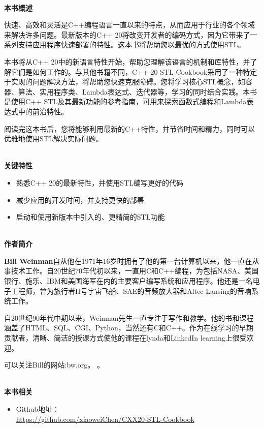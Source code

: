 \documentclass[11pt,a4paper,UTF8]{book}
\begin{document}
\begin{sloppypar}
	\hspace*{\fill} \\ %
	\noindent\textbf{本书概述}
	
	快速、高效和灵活是C++编程语言一直以来的特点，从而应用于行业的各个领域来解决许多问题。最新版本的C++ 20将改变开发者的编码方式，因为它带来了一系列支持应用程序快速部署的特性。这本书将帮助您以最优的方式使用STL。
	
	本书将从C++ 20中的新语言特性开始，帮助您理解该语言的机制和库特性，并了解它们是如何工作的。与其他书籍不同，C++ 20 STL Cookbook采用了一种特定于实现的问题解决方法，将帮助您快速克服障碍。您将学习核心STL概念，如容器、算法、实用程序类、Lambda表达式、迭代器等，学习的同时结合实践。本书是使用C++ STL及其最新功能的参考指南，可用来探索函数式编程和Lambda表达式中的前沿特性。
	
	阅读完这本书后，您将能够利用最新的C++特性，并节省时间和精力，同时可以优雅地使用STL解决实际问题。
	
	\hspace*{\fill} \\ %
	\noindent\textbf{关键特性}
	\begin{itemize}
		\item 熟悉C++ 20的最新特性，并使用STL编写更好的代码
		\item 减少应用的开发时间，并支持更快的部署
		\item 启动和使用新版本中引入的、更精简的STL功能
	\end{itemize}
	
	\hspace*{\fill} \\ %
	\noindent\textbf{作者简介}
	
	\textbf{Bill Weinman}自从他在1971年16岁时拥有了他的第一台计算机以来，他一直在从事技术工作。自20世纪70年代初以来，一直用C和C++编程，为包括NASA、美国银行、施乐、IBM和美国海军在内的主要客户编写系统和应用程序。他还是一名电子工程师，曾为旅行者II号宇宙飞船、SAE的音频放大器和Altec Lansing的音响系统工作。
	
	自20世纪90年代中期以来，Weinman先生一直专注于写作和教学。他的书和课程涵盖了HTML、SQL、CGI、Python，当然还有C和C++。作为在线学习的早期贡献者，清晰、简洁的授课方式使他的课程在lynda和LinkedIn learning上很受欢迎。
	
	可以关注Bill的网站:bw.org。
	。
	
	\hspace*{\fill} \\ %
	\noindent\textbf{本书相关}
	\begin{itemize}
		\item Github地址：\\\url{https://github.com/xiaoweiChen/CXX20-STL-Cookbook}
	\end{itemize}
	\newpage
	

\end{sloppypar}
\end{document}
